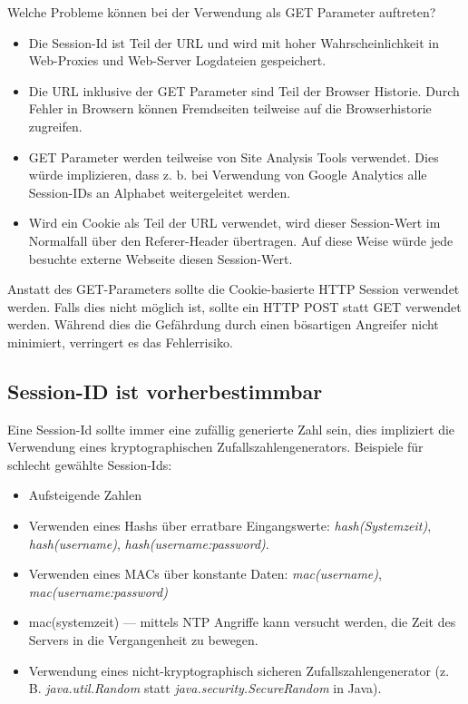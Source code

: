 Welche Probleme können bei der Verwendung als GET Parameter auftreten?

\begin{itemize}
	\item Die Session-Id ist Teil der URL und wird mit hoher Wahrscheinlichkeit in Web-Proxies und Web-Server Logdateien gespeichert.
	\item Die URL inklusive der GET Parameter sind Teil der Browser Historie. Durch Fehler in Browsern können Fremdseiten teilweise auf die Browserhistorie zugreifen.
	\item GET Parameter werden teilweise von Site Analysis Tools verwendet. Dies würde implizieren, dass z. b. bei Verwendung von Google Analytics alle Session-IDs an Alphabet weitergeleitet werden.
	\item Wird ein Cookie als Teil der URL verwendet, wird dieser Session-Wert im Normalfall über den Referer-Header übertragen. Auf diese Weise würde jede besuchte externe Webseite diesen Session-Wert.
\end{itemize}

Anstatt des GET-Parameters sollte die Cookie-basierte HTTP Session verwendet werden. Falls dies nicht möglich ist, sollte ein HTTP POST statt GET verwendet werden. Während dies die Gefährdung durch einen bösartigen Angreifer nicht minimiert, verringert es das Fehlerrisiko.

\subsection{Session-ID ist vorherbestimmbar}

Eine Session-Id sollte immer eine zufällig generierte Zahl sein, dies impliziert die Verwendung eines kryptographischen Zufallszahlengenerators. Beispiele für schlecht gewählte Session-Ids:

\begin{itemize}
	\item Aufsteigende Zahlen
	\item Verwenden eines Hashs über erratbare Eingangswerte: \textit{hash(Systemzeit)}, \textit{hash(username)}, \textit{hash(username:password)}.
	\item Verwenden eines MACs über konstante Daten: \textit{mac(username)}, \textit{mac(username:password)}
	\item mac(systemzeit) --- mittels NTP Angriffe kann versucht werden, die Zeit des Servers in die Vergangenheit zu bewegen.
	\item Verwendung eines nicht-kryptographisch sicheren Zufallszahlengenerator (z. B. \textit{java.util.Random} statt \textit{java.security.SecureRandom} in Java).
\end{itemize}

